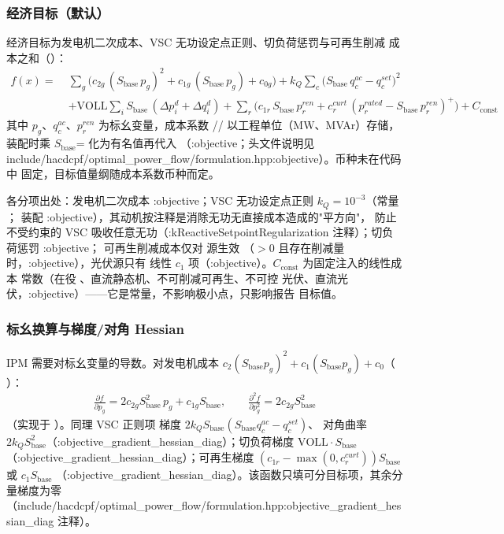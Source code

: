 \subsubsection*{经济目标（默认）}
经济目标为发电机二次成本、VSC 无功设定点正则、切负荷惩罚与可再生削减
成本之和（）：
\begin{align*}
f(x)=\;&\sum_{g}\Big(c_{2g}\,(S_{\mathrm{base}}\,p_g)^2
       +c_{1g}\,(S_{\mathrm{base}}\,p_g)+c_{0g}\Big)
 +k_{Q}\sum_{c}\Big(S_{\mathrm{base}}\,q^{ac}_c-q^{set}_c\Big)^2\\
 &+\mathrm{VOLL}\sum_{i}S_{\mathrm{base}}\,(\Delta p^d_i+\Delta q^d_i)
 +\sum_{r}\Big(c_{1r}\,S_{\mathrm{base}}\,p^{ren}_r
 +c^{curt}_r\,(p^{rated}_r-S_{\mathrm{base}}\,p^{ren}_r)^+\Big)
 +C_{\mathrm{const}}
\end{align*}
其中 $p_g$、$q^{ac}_c$、$p^{ren}_r$ 为标幺变量，成本系数
// 以工程单位（MW、MVAr）存储，
装配时乘 $S_{\mathrm{base}}$= 化为有名值再代入
（:objective；头文件说明见 include/hacdcpf/optimal\_power\_flow/formulation.hpp:objective）。币种未在代码中
固定，目标值量纲随成本系数币种而定。

各分项出处：发电机二次成本 :objective；VSC 无功设定点正则
$k_{Q}=10^{-3}$（常量 ；
装配 :objective），其动机按注释是消除无功无直接成本造成的"平方向"，
防止不受约束的 VSC 吸收任意无功（:kReactiveSetpointRegularization 注释）；切负荷惩罚 :objective；
可再生削减成本仅对  源生效
（$>0$ 且存在削减量时，:objective），光伏源只有
线性 $c_1$ 项（:objective）。$C_{\mathrm{const}}$ 为固定注入的线性成本
常数（在役 、直流静态机、不可削减可再生、不可控
光伏、直流光伏，:objective）——它是常量，不影响极小点，只影响报告
目标值。

\subsubsection*{标幺换算与梯度/对角 Hessian}
IPM 需要对标幺变量的导数。对发电机成本
$c_2(S_{\mathrm{base}}p_g)^2+c_1(S_{\mathrm{base}}p_g)+c_0$（
）：
\begin{align*}
\frac{\partial f}{\partial p_g}
 =2c_{2g}S_{\mathrm{base}}^2\,p_g+c_{1g}S_{\mathrm{base}},\qquad
\frac{\partial^2 f}{\partial p_g^2}=2c_{2g}S_{\mathrm{base}}^2
\end{align*}
（实现于 ）。同理 VSC 正则项
梯度 $2k_{Q}S_{\mathrm{base}}(S_{\mathrm{base}}q^{ac}_c-q^{set}_c)$、
对角曲率 $2k_{Q}S_{\mathrm{base}}^2$（:objective\_gradient\_hessian\_diag）；切负荷梯度
$\mathrm{VOLL}\cdot S_{\mathrm{base}}$（:objective\_gradient\_hessian\_diag）；可再生梯度
$(c_{1r}-\max(0,c^{curt}_r))S_{\mathrm{base}}$ 或 $c_1 S_{\mathrm{base}}$
（:objective\_gradient\_hessian\_diag）。该函数只填可分目标项，其余分量梯度为零
（include/hacdcpf/optimal\_power\_flow/formulation.hpp:objective\_gradient\_hessian\_diag 注释）。

